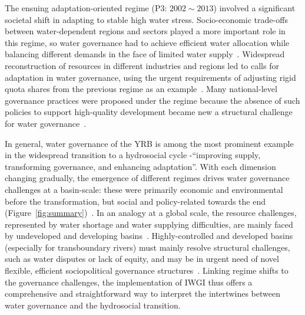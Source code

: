 \documentclass[draft]{agujournal2019}
\begin{document}
The ensuing adaptation-oriented regime (P3: $2002 \sim 2013$) involved a significant societal shift in adapting to stable high water stress.
Socio-economic trade-offs between water-dependent regions and sectors played a more important role in this regime, so water governance had to achieve efficient water allocation while balancing different demands in the face of limited water supply~\cite{dalin2015,song2022}.
Widespread reconstruction of resources in different industries and regions led to calls for adaptation in water governance, using the urgent requirements of adjusting rigid quota shares from the previous regime as an example~\cite{wang2019e}.
Many national-level governance practices were proposed under the regime because the absence of such policies to support high-quality development became new a structural challenge for water governance~\cite{konar2019}.

In general, water governance of the YRB is among the most prominent example in the widespread transition to a hydrosocial cycle -``improving supply, transforming governance, and enhancing adaptation''.
With each dimension changing gradually, the emergence of different regimes drives water governance challenges at a basin-scale: these were primarily economic and environmental before the transformation, but social and policy-related towards the end (Figure~\ref{fig:summary})~\cite{singh2019,porcher2019}.
In an analogy at a global scale, the resource challenges, represented by water shortage and water supplying difficulties, are mainly faced by undeveloped and developing basins~\cite{allan2019,speed2013,liu2012a}.
Highly-controlled and developed basins (especially for transboundary rivers) must mainly resolve structural challenges, such as water disputes or lack of equity, and may be in urgent need of novel flexible, efficient sociopolitical governance structures~\cite{unep-dhi2016,mirumachi2015}.
Linking regime shifts to the governance challenges, the implementation of IWGI thus offers a comprehensive and straightforward way to interpret the intertwines between water governance and the hydrosocial transition.
\end{document}
